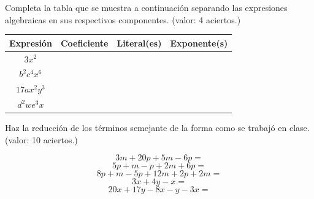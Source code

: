\documentclass[11pt]{article}
\begin{document}
Completa la tabla que se muestra a continuaci\'on separando las expresiones
algebraicas en sus respectivos componentes. (valor: 4 aciertos.)

\begin{center}
{\large
\begin{tabular}{|c|c|c|c|}
\hline
Expresi\'on & Coeficiente & Literal(es) & Exponente(s)  \\ \hline 
\Large $3x^2$ &&&\\ \hline
\Large $b^2c^4x^6$ &&&\\ \hline
\Large $17ax^2y^3$ &&&\\ \hline
\Large $d^2we^3x$ &&&\\ \hline
\end{tabular}
}
\end{center}

Haz la reducci\'on de los t\'erminos semejante de la forma como se trabaj\'o en
clase. (valor: 10 aciertos.)

\begin{equation*}
3m + 20p + 5m - 6p = 
\end{equation*}
\begin{equation*}
5p + m -p +2m + 6p =
\end{equation*}
\begin{equation*}
8p + m -5p + 12m + 2p + 2m =
\end{equation*}
\begin{equation*}
3x + 4y - x = 
\end{equation*}
\begin{equation*}
20x + 17y - 8x - y -3x =
\end{equation*}
\end{document}
